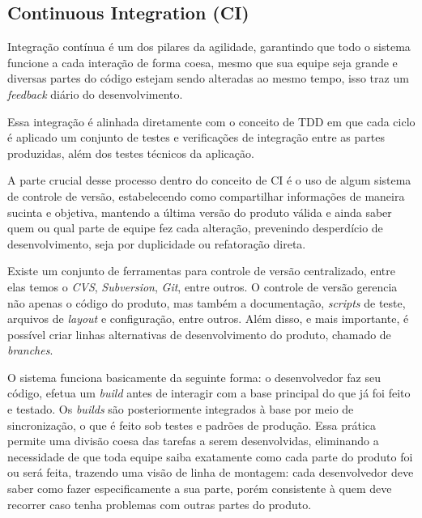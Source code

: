 \subsection{Continuous Integration (CI)}
\par Integração contínua é um dos pilares da agilidade, garantindo que todo o sistema funcione a cada interação de forma coesa, mesmo que sua equipe seja grande e diversas partes do código estejam sendo alteradas ao mesmo tempo, isso traz um \emph{feedback} diário do desenvolvimento.
\par Essa integração é alinhada diretamente com o conceito de TDD em que cada ciclo é aplicado um conjunto de testes e verificações de integração entre as partes produzidas, além dos testes técnicos da aplicação.
\par A parte crucial desse processo dentro do conceito de CI é o uso de algum sistema de controle de versão, estabelecendo como compartilhar informações de maneira sucinta e objetiva, mantendo a última versão do produto válida e ainda saber quem ou qual parte de equipe fez cada alteração, prevenindo desperdício de desenvolvimento, seja por duplicidade ou refatoração direta.
\par Existe um conjunto de ferramentas para controle de versão centralizado, entre elas temos o \emph{CVS}, \emph{Subversion}, \emph{Git}, entre outros. O controle de versão gerencia não apenas o código do produto, mas também a documentação, \emph{scripts} de teste, arquivos de \emph{layout} e configuração, entre outros. Além disso, e mais importante, é possível criar linhas alternativas de desenvolvimento do produto, chamado de \emph{branches}.
\par O sistema funciona basicamente da seguinte forma: o desenvolvedor faz seu código, efetua um \emph{build} antes de interagir com a base principal do que já foi feito e testado. Os \emph{builds} são posteriormente integrados à base por meio de sincronização, o que é feito sob testes e padrões de produção. Essa prática permite uma divisão coesa das tarefas a serem desenvolvidas, eliminando a necessidade de que toda equipe saiba exatamente como cada parte do produto foi ou será feita, trazendo uma visão de linha de montagem: cada desenvolvedor deve saber como fazer especificamente a sua parte, porém consistente à quem deve recorrer caso tenha problemas com outras partes do produto.
